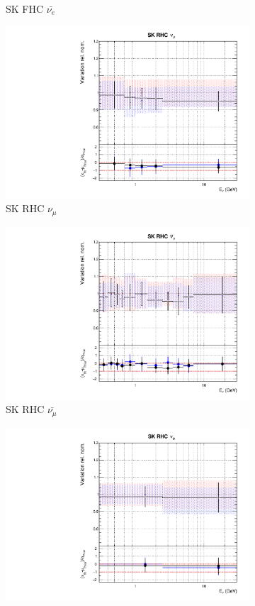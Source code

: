 \begin{figure}[t]
\begin{subfigure}{0.42\textwidth}
  \caption{SK FHC $\bar{\nu_e}$}
\end{subfigure}
\begin{subfigure}{0.42\textwidth}
  \centering
  \includegraphics[width=0.75\linewidth]{figs/rhcmpasmvflux12}
  \caption{SK RHC $\nu_{\mu}$}
\end{subfigure}
\begin{subfigure}{0.42\textwidth}
  \centering
  \includegraphics[width=0.75\linewidth]{figs/rhcmpasmvflux13}
  \caption{SK RHC $\bar{\nu_{\mu}}$}
\end{subfigure}
\begin{subfigure}{0.42\textwidth}
  \centering
  \includegraphics[width=0.75\linewidth]{figs/rhcmpasmvflux14}

\end{subfigure}
\end{figure}
